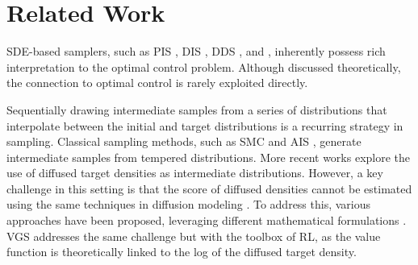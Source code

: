 \section{Related Work}
SDE-based samplers, such as PIS \cite{zhang2022path}, DIS \cite{berner2022optimal}, DDS \cite{vargas2023denoising}, and \citet{richter2024improved}, inherently possess rich interpretation to the optimal control problem. Although discussed theoretically, the connection to optimal control is rarely exploited directly. 


Sequentially drawing intermediate samples from a series of distributions that interpolate between the initial and target distributions is a recurring strategy in sampling. Classical sampling methods, such as SMC \cite{moral2006smc} and AIS \cite{neal2001annealed}, generate intermediate samples from tempered distributions.
More recent works explore the use of diffused target densities as intermediate distributions. However, a key challenge in this setting is that the score of diffused densities cannot be estimated using the same techniques in diffusion modeling \cite{sohl-dickstein15,ho2020ddpm,song2021scorebased}. To address this, various approaches have been proposed, leveraging different mathematical formulations \cite{akhound-sadegh2024iterated,phillips2024particle,huang2024reverse,mcdonald2022proposal,wang2024energy,chen2024sequential}. VGS addresses the same challenge but with the toolbox of RL, as the value function is theoretically linked to the log of the diffused target density.